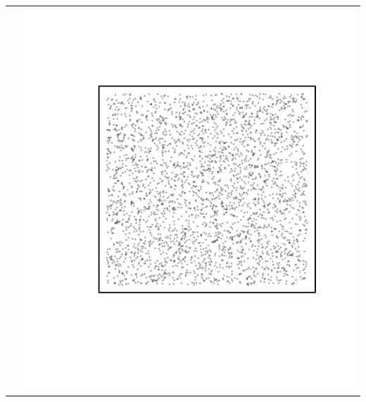 \documentclass{article}\usepackage{graphicx, color}
\makeatletter
\def\maxwidth{ %
  \ifdim\Gin@nat@width>\linewidth
    \linewidth
  \else
    \Gin@nat@width
  \fi
}
\newenvironment{knitrout}{}{} %
\makeatother
\begin{document}
\begin{tabular}{cc}
&
\begin{knitrout}
\definecolor{shadecolor}{rgb}{0.969, 0.969, 0.969}\color{fgcolor}\includegraphics[width=\maxwidth]{figure/unnamed-chunk-34} 
\end{knitrout}

\\
\end{tabular}
\end{document}
